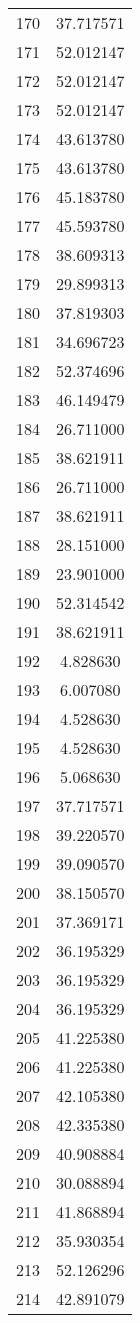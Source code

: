 \documentclass[12pt]{article}
\begin{document}
\begin{longtable}{@{}cc@{}}
170 & 37.717571 \\
171 & 52.012147 \\
172 & 52.012147 \\
173 & 52.012147 \\
174 & 43.613780 \\
175 & 43.613780 \\
176 & 45.183780 \\
177 & 45.593780 \\
178 & 38.609313 \\
179 & 29.899313 \\
180 & 37.819303 \\
181 & 34.696723 \\
182 & 52.374696 \\
183 & 46.149479 \\
184 & 26.711000 \\
185 & 38.621911 \\
186 & 26.711000 \\
187 & 38.621911 \\
188 & 28.151000 \\
189 & 23.901000 \\
190 & 52.314542 \\
191 & 38.621911 \\
192 & 4.828630 \\
193 & 6.007080 \\
194 & 4.528630 \\
195 & 4.528630 \\
196 & 5.068630 \\
197 & 37.717571 \\
198 & 39.220570 \\
199 & 39.090570 \\
200 & 38.150570 \\
201 & 37.369171 \\
202 & 36.195329 \\
203 & 36.195329 \\
204 & 36.195329 \\
205 & 41.225380 \\
206 & 41.225380 \\
207 & 42.105380 \\
208 & 42.335380 \\
209 & 40.908884 \\
210 & 30.088894 \\
211 & 41.868894 \\
212 & 35.930354 \\
213 & 52.126296 \\
214 & 42.891079 \\

\end{longtable}
\end{document}
